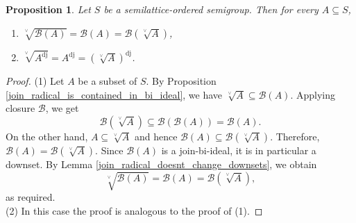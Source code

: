 \documentclass[10pt, reqno]{amsart}
\theoremstyle{plain}
\newtheorem{prop}[theorem]{Proposition}
\theoremstyle{definition}
\begin{document}
\begin{prop}
    Let $S$ be a semilattice-ordered semigroup. Then for every $A \subseteq S$, 
    \begin{enumerate}[label=(\arabic*)]
        \item $\sqrt[\lor]{\mathcal{B}(A)} = \mathcal{B}(A) = \mathcal{B}({\sqrt[\lor]{A}})$,
        \item $\sqrt[\lor]{A^\mathrm{dj}} = A^\mathrm{dj} = (\sqrt[\lor]{A})^\mathrm{dj}$.
    \end{enumerate} 
\end{prop}
\begin{proof}
    (1) Let $A$ be a subset of $S$. By Proposition \ref{join_radical_is_contained_in_bi_ideal}, we have $\sqrt[\lor]{A} \subseteq \mathcal{B}(A)$. Applying closure $\mathcal{B}$, we get $$\mathcal{B}(\sqrt[\lor]{A}) \subseteq \mathcal{B}(\mathcal{B}(A)) = \mathcal{B}(A).$$ On the other hand, $A \subseteq \sqrt[\lor]{A}$ and hence $\mathcal{B}(A) \subseteq \mathcal{B}(\sqrt[\lor]{A})$. Therefore, $\mathcal{B}(A) = \mathcal{B}(\sqrt[\lor]{A})$. Since $\mathcal{B}(A)$ is a join-bi-ideal, it is in particular a downset. By Lemma \ref{join_radical_doesnt_change_downsets}, we obtain $$\sqrt[\lor]{\mathcal{B}(A)} = \mathcal{B}(A) = \mathcal{B}(\sqrt[\lor]{A}),$$ as required. \\
    (2) In this case the proof is analogous to the proof of (1). 
\end{proof}
\end{document}

